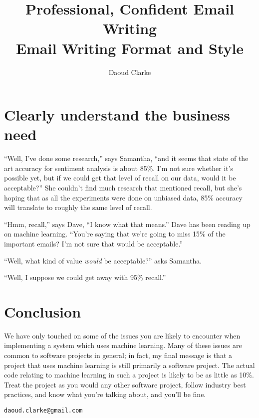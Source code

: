 \documentclass[ebook,article,11pt]{memoir}
\author{Daoud Clarke}
\title{\textbf{Professional, Confident Email Writing}\\
Email Writing Format and Style}
\date{}
\begin{document}
\maketitle


\chapter{Clearly understand the business need}


\begin{block}[frametitle={Metrics}]

``Well, I've done some research,'' says Samantha, ``and it seems that
state of the art accuracy for sentiment analysis is about 85\%. I'm
not sure whether it's possible yet, but if we could get that level of
recall on our data, would it be acceptable?'' She couldn't find much
research that mentioned recall, but she's hoping that as all the
experiments were done on unbiased data, 85\% accuracy will translate
to roughly the same level of recall.

``Hmm, recall,'' says Dave, ``I know what that means.'' Dave has been
reading up on machine learning. ``You're saying that we're going to
miss 15\% of the important emails? I'm not sure that would be
acceptable.''

``Well, what kind of value \emph{would} be acceptable?'' asks
Samantha.

``Well, I suppose we could get away with 95\% recall.''

\end{block}


\newpage
\chapter*{Conclusion}

We have only touched on some of the issues you are likely to encounter
when implementing a system which uses machine learning. Many of these
issues are common to software projects in general; in fact, my final
message is that a project that uses machine learning is still
primarily a software project. The actual code relating to machine
learning in such a project is likely to be as little as 10\%. Treat
the project as you would any other software project, follow industry
best practices, and know what you're talking about, and you'll be fine.

\begin{block}
\texttt{daoud.clarke@gmail.com}
\end{block}
\end{document}
